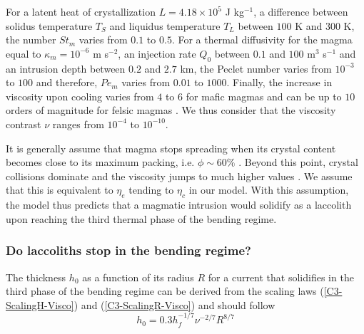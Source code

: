 For a latent heat of crystallization $L = 4.18\times10^5$ J kg$^{-1}$,
a   difference  between   solidus  temperature   $T_S$  and   liquidus
temperature  $T_L$ between  $100$ K  and  $300$ K,  the number  $St_m$
varies from $0.1$  to $0.5$.  For a thermal diffusivity  for the magma
equal  to $\kappa_m=  10^{-6}$  m s$^{-2}$,  an  injection rate  $Q_0$
between $0.1$ and $100$ m$^3$  s$^{-1}$ and an intrusion depth between
$0.2$ and $2.7$  km, the Peclet number varies from  $10^{-3}$ to $100$
and  therefore, $Pe_m$  varies from  $0.01$ to  $1000$.  Finally,  the
increase in  viscosity upon cooling varies  from $4$ to $6$  for mafic
magmas and  can be up  to $10$ orders  of magnitude for  felsic magmas
\citep{Anonymous:CZVBrBvv,Lejeune:1995fc,Giordano:2008em,Diniega:2013eh}.
We  thus  consider  that  the viscosity  contrast  $\nu$  ranges  from
$10^{-4}$ to $10^{-10}$.

It is  generally assume  that magma stops  spreading when  its crystal
content becomes close  to its maximum packing, i.e.   $\phi \sim 60\%$
\citep{Pinkerton:1992fw}.   Beyond  this   point,  crystal  collisions
dominate   and   the   viscosity   jumps   to   much   higher   values
\citep{Lejeune:1995fc,Giordano:2008em}.   We   assume  that   this  is
equivalent to  $\eta_e$ tending to  $\eta_c$ in our model.   With this
assumption, the  model thus predicts  that a magmatic  intrusion would
solidify as a  laccolith upon reaching the third thermal  phase of the
bending regime.

\subsubsection*{Do laccoliths stop in the bending regime?}
\label{C4-sec:range-valu-dimens}

The thickness $h_0$ as a function of its radius $R$ for a current that
solidifies in  the third phase  of the  bending regime can  be derived
from     the     scaling    laws     (\ref{C3-ScalingH-Visco})     and
(\ref{C3-ScalingR-Visco}) and should follow
\begin{equation}
  h_0 = 0.3 h_f^{-1/7}\nu^{-2/7}R^{8/7}\label{C4-Hr}
\end{equation}


